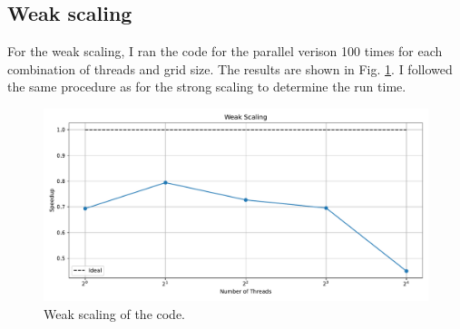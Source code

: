 \documentclass[unicode,11pt,a4paper,oneside,numbers=endperiod,openany]{scrartcl}
\begin{document}
\subsection*{Weak scaling}
For the weak scaling, I ran the code for the parallel verison 100 times for each
combination of threads and grid size. The results are shown in Fig.
\ref{im:weak_scaling}. I followed the same procedure as for the strong scaling
to determine the run time.

\begin{figure}
    \centering
    \includegraphics[width=\textwidth]{../mini_app/weak_scaling_plot.pdf}
    \caption{Weak scaling of the code.}
    \label{im:weak_scaling}
\end{figure}
\end{document}
